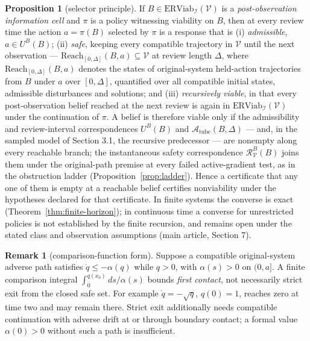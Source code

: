 \documentclass[11pt]{article}
\theoremstyle{definition}
\newtheorem{proposition}{Proposition}
\newtheorem{remark}{Remark}
\begin{document}
\begin{proposition}[selector principle]\label{prop:selector}
If \(B\in\mathrm{ERViab}_{\mathcal{I}}(\mathcal{V})\) is a \emph{post-observation information cell} and \(\pi\) is a
policy witnessing viability on \(B\), then at every review time the
action \(a=\pi(B)\) selected by \(\pi\) is a response that is
(i) \emph{admissible}, \(a\in U^B(B)\); (ii) \emph{safe}, keeping every
compatible trajectory in \(\mathcal{V}\) until the next observation ---
\(\mathrm{Reach}_{[0,\Delta]}(B,a)\subseteq\mathcal{V}\) at review
length \(\Delta\), where \(\mathrm{Reach}_{[0,\Delta]}(B,a)\) denotes
the states of original-system held-action trajectories from \(B\)
under \(a\) over \([0,\Delta]\), quantified over all compatible
initial states, admissible disturbances and solutions; and (iii) \emph{recursively viable}, in that every
post-observation belief reached at the next review is again in
\(\mathrm{ERViab}_{\mathcal{I}}(\mathcal{V})\) under the continuation
of \(\pi\). A belief is therefore viable only if the admissibility and
review-interval correspondences \(U^B(B)\) and
\(\mathcal{A}_{\mathrm{tube}}(B,\Delta)\) --- and, in the sampled
model of Section 3.1, the recursive predecessor --- are nonempty along
every reachable branch; the instantaneous safety correspondence
\(\mathcal{R}_{\mathcal{V}}^B(B)\) joins them under the original-path
premise at every failed active-gradient test, as in the obstruction
ladder (Proposition~\ref{prop:ladder}). Hence a certificate that
any one of them is empty at a reachable belief certifies nonviability
under the hypotheses declared for that certificate. In finite systems
the converse is exact (Theorem~\ref{thm:finite-horizon}); in continuous time a converse for unrestricted policies is not established by the finite recursion, and remains open under the stated class and observation assumptions (main article, Section 7).
\end{proposition}

\begin{remark}[comparison-function form]\label{rem:comparison}
Suppose a compatible original-system adverse path satisfies \(\dot q\le-\alpha(q)\) while \(q>0\), with \(\alpha(s)>0\) on \((0,a]\). A finite comparison integral \(\int_0^{q(x_0)}ds/\alpha(s)\) bounds \emph{first contact}, not necessarily strict exit from the closed safe set. For example \(\dot q=-\sqrt q\), \(q(0)=1\), reaches zero at time two and may remain there. Strict exit additionally needs compatible continuation with adverse drift at or through boundary contact; a formal value \(\alpha(0)>0\) without such a path is insufficient.
\end{remark}
\end{document}
